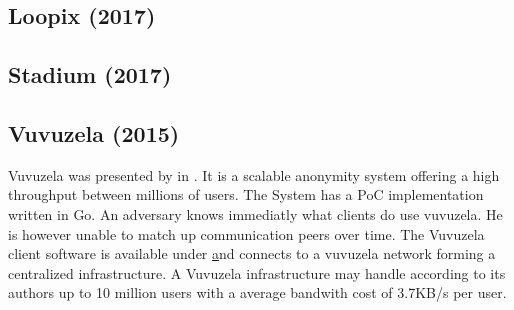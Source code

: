 %

\subsection{Loopix (2017)}
\cite{piotrowska2017loopix}

%

\subsection{Stadium (2017)}
\cite{tyagi2017stadium}

%

\subsection{Vuvuzela (2015)}
Vuvuzela was presented by \citeauthor{van2015vuvuzela} in \cite{van2015vuvuzela}. It is a scalable anonymity system offering a high throughput between millions of users. The System has a PoC implementation written in Go. An adversary knows immediatly what clients do use vuvuzela. He is however unable to match up communication peers over time. The Vuvuzela client software is available under \href{https://vuvuzela.io/} and connects to a vuvuzela network forming a centralized infrastructure. A Vuvuzela infrastructure may handle according to its authors up to 10 million users with a average bandwith cost of 3.7KB/s per user.



